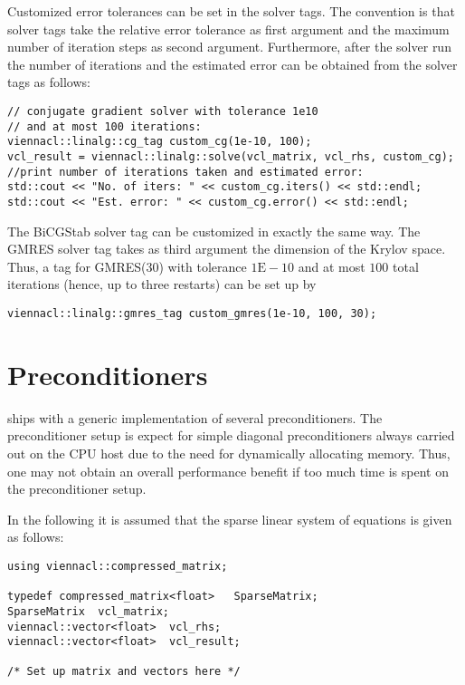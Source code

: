 Customized error tolerances can be set in the solver tags. The convention is
that solver tags take the relative error tolerance as first argument and the
maximum number of iteration steps as second argument. Furthermore, after the
solver run the number of iterations and the estimated error can be obtained from
the solver tags as follows:
\begin{lstlisting}
// conjugate gradient solver with tolerance 1e10
// and at most 100 iterations:
viennacl::linalg::cg_tag custom_cg(1e-10, 100);
vcl_result = viennacl::linalg::solve(vcl_matrix, vcl_rhs, custom_cg);
//print number of iterations taken and estimated error:
std::cout << "No. of iters: " << custom_cg.iters() << std::endl;
std::cout << "Est. error: " << custom_cg.error() << std::endl;
\end{lstlisting}
The BiCGStab solver tag can be customized in exactly the same way. The GMRES
solver tag takes as third argument the dimension of the Krylov space. Thus, a
tag for GMRES(30) with tolerance $1\mathrm{E}\!-\!10$ and at most $100$ total
iterations
(hence, up to three restarts) can be set up by 
\begin{lstlisting}
viennacl::linalg::gmres_tag custom_gmres(1e-10, 100, 30);
\end{lstlisting}

\section{Preconditioners} \label{sec:preconditioner}
{\ViennaCL} ships with a generic implementation of several preconditioners.
The preconditioner setup is expect for simple diagonal preconditioners always carried out on the CPU host due to the need for dynamically allocating memory.
Thus, one may not obtain an overall performance benefit if too much time is spent on the preconditioner setup.


In the following it is assumed that the sparse linear system of equations is given as follows:
\begin{lstlisting}
using viennacl::compressed_matrix;

typedef compressed_matrix<float>   SparseMatrix;
SparseMatrix  vcl_matrix;
viennacl::vector<float>  vcl_rhs;
viennacl::vector<float>  vcl_result;

/* Set up matrix and vectors here */
\end{lstlisting}


